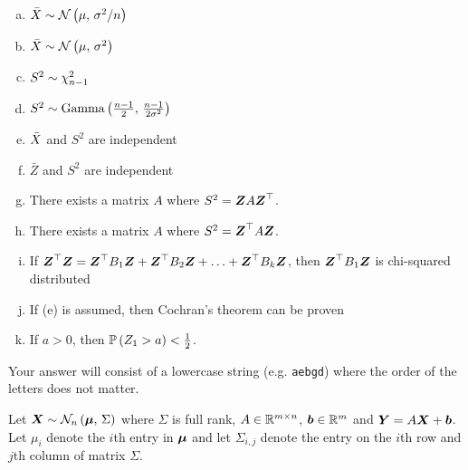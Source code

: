\documentclass[12pt,landscape]{article}
\newcommand{\instr}{\small Your answer will consist of a lowercase string (e.g. \texttt{aebgd}) where the order of the letters does not matter. \normalsize}
\begin{document}
\begin{enumerate}[(a)]
\item $\bar{X} \sim \mathcal{N}\left(\mu,\,\sigma^2 / n\right)$
\item $\bar{X} \sim \mathcal{N}\left(\mu,\,\sigma^2\right)$
\item $S^2 \sim \chi^2_{n-1}$
\item $S^2 \sim \mathrm{Gamma}\left(\frac{n-1}{2},\,\frac{n-1}{2\sigma^2}\right)$
\item $\bar{X}$ and $S^2$ are independent
\item $\bar{Z}$ and $S^2$ are independent
\item There exists a matrix $A$ where $S^2 = \boldsymbol{Z} A \boldsymbol{Z}^\top$.
\item There exists a matrix $A$ where $S^2 = \boldsymbol{Z}^\top A \boldsymbol{Z}$.
\item If $\boldsymbol{Z}^\top \boldsymbol{Z} = \boldsymbol{Z}^\top B_1 \boldsymbol{Z} + \boldsymbol{Z}^\top B_2 \boldsymbol{Z} + \ldots + \boldsymbol{Z}^\top B_k\boldsymbol{Z}$, then $ \boldsymbol{Z}^\top B_1 \boldsymbol{Z}$ is chi-squared distributed
\item If (e) is assumed, then Cochran's theorem can be proven
\item If $a>0$, then $\mathbb{P}\left(Z_1 > a\right) < \frac{1}{2}$.
\end{enumerate}
\eenum\instr\pagebreak


\problem{} Let $\boldsymbol{X} \sim \mathcal{N}_{n}\left(\boldsymbol{\mu},\,\Sigma\right)$ where $\Sigma$ is full rank, $A \in \mathbb{R}^{m \times n}$,  $\boldsymbol{b} \in \mathbb{R}^m$ and $\boldsymbol{Y} = A\boldsymbol{X} + \boldsymbol{b}$. Let $\mu_i$ denote the $i$th entry in $\boldsymbol{\mu}$ and let $\Sigma_{i,j}$ denote the entry on the $i$th row and $j$th column of matrix $\Sigma$.

\vspace{-0.2cm}\benum{} 
\end{document}

